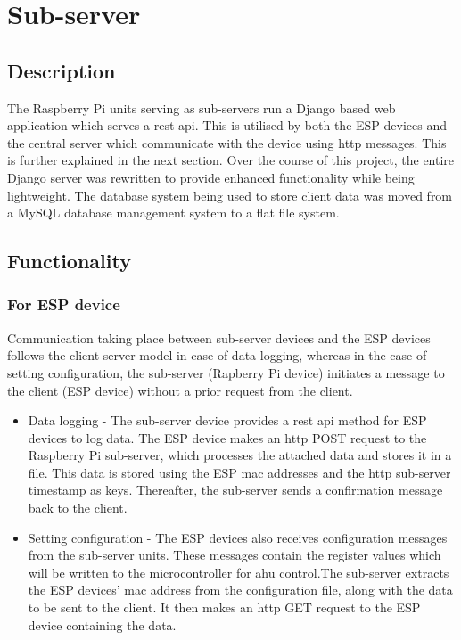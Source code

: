 \documentclass[letterpaper,11pt]{report}
\begin{document}
\section{Sub-server}
\subsection{Description}
The Raspberry Pi units serving as sub-servers run a Django based web application which serves a \ac{rest} \ac{api}. This is utilised by both the ESP devices and the central server which communicate with the device using \ac{http} messages. This is further explained in the next section. Over the course of this project, the entire Django server was rewritten to provide enhanced functionality while being lightweight. The database system being used to store client data was moved from a MySQL database management system to a flat file system.
\subsection{Functionality}
\subsubsection{For ESP device}
Communication taking place between sub-server devices and the ESP devices follows the client-server model in case of data logging, whereas in the case of setting configuration, the sub-server (Rapberry Pi device) initiates a message to the client (ESP device) without a prior request from the client.
\begin{itemize}
    \item Data logging - The sub-server device provides a \ac{rest} \ac{api} method for ESP devices to log data. The ESP device makes an \ac{http} POST request to the Raspberry Pi sub-server, which processes the attached data and stores it in a file. This data is stored using the ESP \ac{mac} addresses and the \ac{http} sub-server timestamp as keys. Thereafter, the sub-server sends a confirmation message back to the client.
    \item Setting configuration - The ESP devices also receives configuration messages from the sub-server units. These messages contain the register values which will be written to the microcontroller for \ac{ahu} control.\hfill \break The sub-server extracts the ESP devices' \ac{mac} address from the configuration file, along with the data to be sent to the client. It then makes an \ac{http} GET request to the ESP device containing the data.
\end{itemize}
\end{document}
